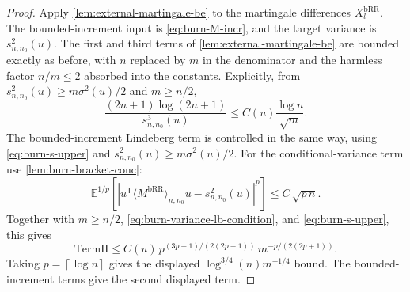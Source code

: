 \begin{proof} Apply \cref{lem:external-martingale-be} to the martingale differences
$X_{l}^{\mathrm{bRR}}$. The bounded-increment input is
\eqref{eq:burn-M-incr}, and the target variance is $s_{n,n_{0}}^{2}(u)$. The first and
third terms of \cref{lem:external-martingale-be} are bounded exactly as before, with
$n$ replaced by $m$ in the denominator and the harmless factor
$n / m \le 2$ absorbed into the constants. Explicitly, from
$s_{n,n_{0}}^{2}(u) \ge m \sigma^{2}(u) / 2$ and $m \ge n / 2$,
\begin{equation}
\frac{(2 n + 1) \log\left(2 n + 1\right)}{s_{n,n_{0}}^{3}(u)}
  \le C(u) \frac{\log n}{\sqrt{m}}.
\label{eq:burn-martingale-be-first-nm}
\end{equation}
The bounded-increment Lindeberg term is controlled in the same way, using
\eqref{eq:burn-s-upper} and $s_{n,n_{0}}^{2}(u) \ge m \sigma^{2}(u) / 2$. For the
conditional-variance term use
\cref{lem:burn-bracket-conc}:
\[
\mathbb{E}^{1 / p} \left[ | u^{\mathsf{T}} \langle M^{\mathrm{bRR}} \rangle_{n,n_{0}} u
    - s_{n,n_{0}}^{2}(u) |^{p} \right]
  \le C \, \sqrt{p \, n}.
\]
Together with $m \ge n / 2$, \eqref{eq:burn-variance-lb-condition}, and
\eqref{eq:burn-s-upper}, this gives
\[
\mathrm{Term II}
  \le C(u) \, p^{(3 p + 1) / (2 (2 p + 1))}
     \, m^{-p / (2 (2 p + 1))}.
\]
Taking $p = \left\lceil \log n \right\rceil$ gives the displayed
$\log^{3 / 4}(n) m^{-1 / 4}$ bound. The bounded-increment terms give
the second displayed term. \end{proof}
